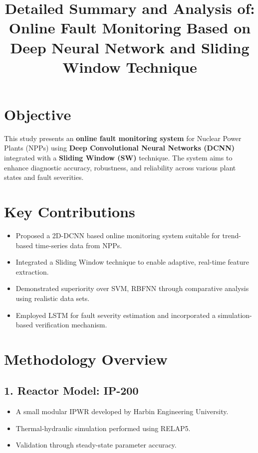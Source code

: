 \documentclass[12pt]{article}
\title{Detailed Summary and Analysis of: \\ \textbf{Online Fault Monitoring Based on Deep Neural Network and Sliding Window Technique}}
\author{}
\date{}
\begin{document}
\maketitle

\section*{Objective}
This study presents an \textbf{online fault monitoring system} for Nuclear Power Plants (NPPs) using \textbf{Deep Convolutional Neural Networks (DCNN)} integrated with a \textbf{Sliding Window (SW)} technique. The system aims to enhance diagnostic accuracy, robustness, and reliability across various plant states and fault severities.

\section*{Key Contributions}
\begin{itemize}
    \item Proposed a 2D-DCNN based online monitoring system suitable for trend-based time-series data from NPPs.
    \item Integrated a Sliding Window technique to enable adaptive, real-time feature extraction.
    \item Demonstrated superiority over SVM, RBFNN through comparative analysis using realistic data sets.
    \item Employed LSTM for fault severity estimation and incorporated a simulation-based verification mechanism.
\end{itemize}

\section*{Methodology Overview}

\subsection*{1. Reactor Model: IP-200}
\begin{itemize}
    \item A small modular IPWR developed by Harbin Engineering University.
    \item Thermal-hydraulic simulation performed using RELAP5.
    \item Validation through steady-state parameter accuracy.
\end{itemize}
\end{document}
